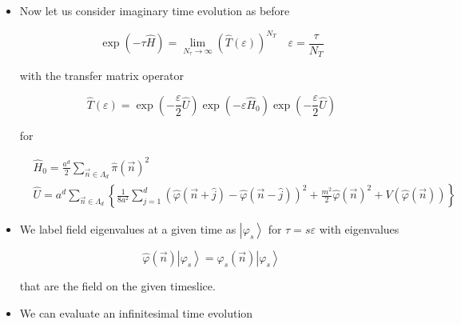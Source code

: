 \begin{itemize}
  \item Now let us consider imaginary time evolution as before

\begin{equation}
\exp (-\tau \hat{H})=\lim _{N_{\tau} \rightarrow \infty}(\hat{T}(\varepsilon))^{N_{T}} \quad \varepsilon=\frac{\tau}{N_{T}}
\end{equation}

with the transfer matrix operator

\begin{equation}
\hat{T}(\varepsilon)=\exp \left(-\frac{\varepsilon}{2} \hat{U}\right) \exp \left(-\varepsilon \hat{H}_{0}\right) \exp \left(-\frac{\varepsilon}{2} \hat{U}\right)
\end{equation}

for

\begin{equation}
\begin{aligned}
& \hat{H}_{0}=\frac{a^{d}}{2} \sum_{\vec{n} \in \Lambda_{d}} \hat{\pi}(\vec{n})^{2} \\
& \hat{U}=a^{d} \sum_{\vec{n} \in \Lambda_{d}}\left\{\frac{1}{8a^{2}} \sum_{j=1}^{d}\left(\hat{\varphi}(\vec{n}+\hat{j})-\hat{\varphi}(\vec{n}-\hat{j})\right)^{2}+\frac{m^{2}}{2} \hat{\varphi}(\vec{n})^{2}+V(\hat\varphi(\vec{n}))\right\}
\end{aligned}
\end{equation}


  \item We label field eigenvalues at a given time as \(\left|\varphi_{s}\right\rangle\) for \(\tau=s \varepsilon\) with eigenvalues

\begin{equation}
\hat{\varphi}(\vec{n})\left|\varphi_{s}\right\rangle=\varphi_{s}(\vec{n})\left|\varphi_{s}\right\rangle
\end{equation}

that are the field on the given timeslice.

  \item We can evaluate an infinitesimal time evolution


\end{itemize}
